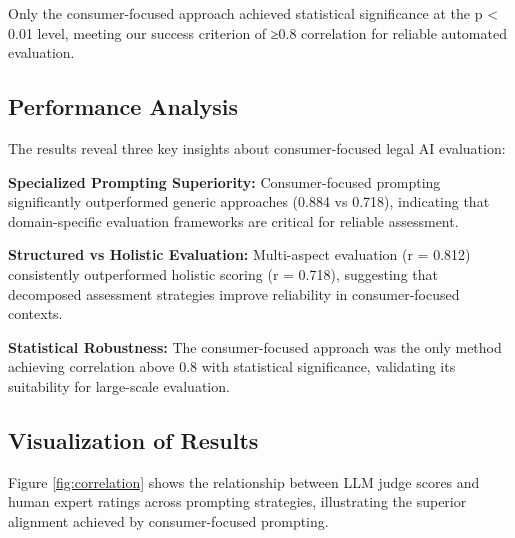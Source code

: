 \documentclass{article}
\begin{document}
Only the consumer-focused approach achieved statistical significance at the p < 0.01 level, meeting our success criterion of ≥0.8 correlation for reliable automated evaluation.

\subsection{Performance Analysis}

The results reveal three key insights about consumer-focused legal AI evaluation:

\textbf{Specialized Prompting Superiority:} Consumer-focused prompting significantly outperformed generic approaches (0.884 vs 0.718), indicating that domain-specific evaluation frameworks are critical for reliable assessment.

\textbf{Structured vs Holistic Evaluation:} Multi-aspect evaluation (r = 0.812) consistently outperformed holistic scoring (r = 0.718), suggesting that decomposed assessment strategies improve reliability in consumer-focused contexts.

\textbf{Statistical Robustness:} The consumer-focused approach was the only method achieving correlation above 0.8 with statistical significance, validating its suitability for large-scale evaluation.

\subsection{Visualization of Results}

Figure \ref{fig:correlation} shows the relationship between LLM judge scores and human expert ratings across prompting strategies, illustrating the superior alignment achieved by consumer-focused prompting.
\end{document}
